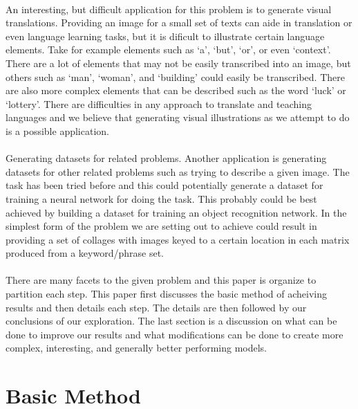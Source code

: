 \documentclass[12pt]{article}
\begin{document}
\paragraph{}
An interesting, but difficult application for this problem is to generate visual translations. 
Providing an image for a small set of texts can aide in translation or even language learning
tasks, but it is dificult to illustrate certain language elements. Take for example elements
such as `a', `but', `or', or even `context'. There are a lot of elements that may not be 
easily transcribed into an image, but others such as `man', `woman', and `building' could
easily be transcribed. There are also more complex elements that can be described such as
the word `luck' or `lottery'. There are difficulties in any approach to translate and 
teaching languages and we believe that generating visual illustrations as we attempt to do 
is a possible application.

\paragraph{}
Generating datasets for related problems.
Another application is generating datasets for other related problems such as trying to 
describe a given image. The task has been tried before and this could potentially generate
a dataset for training a neural network for doing the task. This probably could be best 
achieved by building a dataset for training an object recognition network. In the simplest
form of the problem we are setting out to achieve could result in providing a set of collages
with images keyed to a certain location in each matrix produced from a keyword/phrase set.

\paragraph{}
There are many facets to the given problem and this paper is organize to partition each step. This
paper first discusses the basic method of acheiving results and then details each step. The details
are then followed by our conclusions of our exploration. The last section is a discussion on what 
can be done to improve our results and what modifications can be done to create more complex, 
interesting, and generally better performing models.


\section{Basic Method}
\end{document}
